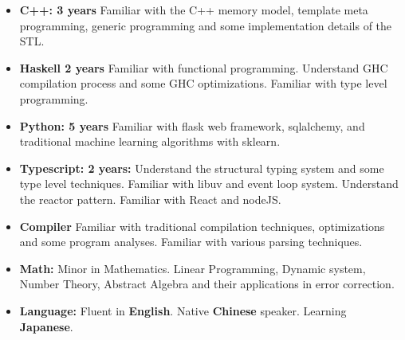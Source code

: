 \documentclass{res}
\begin{document}
\begin{resume}
\begin{itemize}[leftmargin=-.2in]
        \item \textbf{C++: 3 years}
          Familiar with the C++ memory model, template meta programming,
          generic programming and some implementation details of the STL.
          \\

        \item \textbf{Haskell 2 years}
          Familiar with functional programming.
          Understand GHC compilation process and some GHC optimizations.
          Familiar with type level programming.
          \\

        \item \textbf{Python: 5 years}
          Familiar with flask web framework, sqlalchemy, and
          traditional machine learning algorithms with sklearn.
          \\

        \item \textbf{Typescript: 2 years:}
          Understand the structural typing system and some type level techniques.
          Familiar with libuv and event loop system. Understand the reactor pattern.
          Familiar with React and nodeJS.
          \\

        \item \textbf{Compiler} Familiar with traditional compilation techniques, optimizations and some program analyses. Familiar with various parsing techniques.
          \\

        \item \textbf{Math:}
          Minor in Mathematics.
          Linear Programming, Dynamic system, Number Theory, Abstract Algebra and their applications in error correction.  \\
        \item \textbf{Language:} Fluent in \textbf{English}. Native \textbf{Chinese} speaker. Learning \textbf{Japanese}.
    \end{itemize}

\end{resume}
\end{document}
